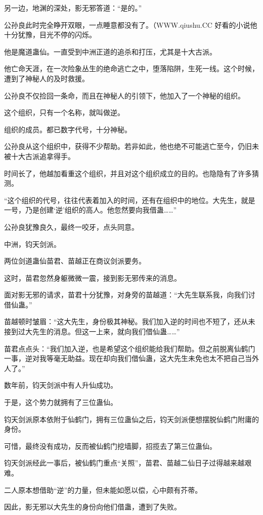 \begin{this_body}
另一边，地渊的深处，影无邪答道：“是的。”

公孙良此时完全睁开双眼，一点睡意都没有了。（WWW.qiushu.CC 好看的小说他十分犹豫，目光不停的闪烁。

他是魔道蛊仙。一直受到中洲正道的追杀和打压，尤其是十大古派。

他亡命天涯，在一次险象丛生的绝命逃亡之中，堕落陷阱，生死一线。这个时候，遭到了神秘人的及时救援。

公孙良不仅捡回一条命，而且在神秘人的引领下，他加入了一个神秘的组织。

这个组织，只有一个名称，就叫做逆。

组织的成员。都已数字代号，十分神秘。

公孙良从这个组织中，获得不少帮助。若非如此，他也绝不可能逃亡至今，仍旧未被十大古派追拿得手。

时间长了，他越加看重这个组织，并且对这个组织成立的目的。也隐隐有了许多猜测。

“这个组织的代号，往往代表着加入的时间，还有在组织中的地位。大先生，就是一号，乃是创建‘逆’组织的高人。他忽然要向我借蛊……”

公孙良犹豫良久，最终一咬牙，点头同意。

中洲，钧天剑派。

两位剑道蛊仙苗君、苗越正在商议剑派要务。

这时，苗君忽然身躯微微一震，接到影无邪传来的消息。

面对影无邪的请求，苗君十分犹豫，对身旁的苗越道：“大先生联系我，向我们讨借仙蛊。”

苗越顿时皱眉：“这大先生，身份极其神秘。我们加入逆的时间也不短了，还从未接到过大先生的消息。但这一上来，就向我们借仙蛊……”

苗君点点头：“我们加入逆，也是希望这个组织能给我们帮助。但之前脱离仙鹤门一事，逆对我等毫无助益。现在却向我们借仙蛊，这大先生未免也太不把自己当外人了。”

数年前，钧天剑派中有人升仙成功。

于是，这个势力就拥有了三位蛊仙。

钧天剑派原本依附于仙鹤门，拥有三位蛊仙之后，钧天剑派便想摆脱仙鹤门附庸的身份。

可惜，最终没有成功，反而被仙鹤门挖墙脚，招揽去了第三位蛊仙。

钧天剑派经此一事后，被仙鹤门重点“关照”，苗君、苗越二仙日子过得越来越艰难。

二人原本想借助“逆”的力量，但未能如愿以偿，心中颇有芥蒂。

因此，影无邪以大先生的身份向他们借蛊，遭到了失败。


\end{this_body}
